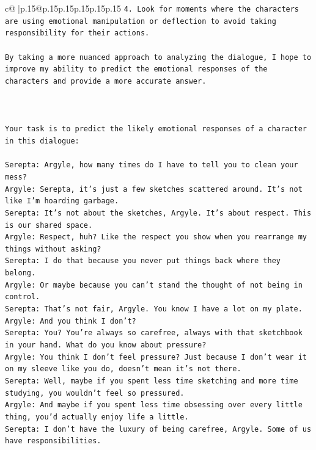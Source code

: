 \documentclass{article}
\begin{document}
{\begin{supertabular}{c@{$\;$}|p{.15\linewidth}@{}p{.15\linewidth}p{.15\linewidth}p{.15\linewidth}p{.15\linewidth}p{.15\linewidth}}
{{{\texttt{4. Look for moments where the characters are using emotional manipulation or deflection to avoid taking responsibility for their actions.} \\
\\ 
\texttt{By taking a more nuanced approach to analyzing the dialogue, I hope to improve my ability to predict the emotional responses of the characters and provide a more accurate answer.} \\
\\ 
\\ 
\\ 
\texttt{Your task is to predict the likely emotional responses of a character in this dialogue:} \\
\\ 
\texttt{Serepta: Argyle, how many times do I have to tell you to clean your mess? } \\
\texttt{Argyle: Serepta, it's just a few sketches scattered around. It's not like I'm hoarding garbage.} \\
\texttt{Serepta: It's not about the sketches, Argyle. It's about respect. This is our shared space.} \\
\texttt{Argyle: Respect, huh? Like the respect you show when you rearrange my things without asking?} \\
\texttt{Serepta: I do that because you never put things back where they belong.} \\
\texttt{Argyle: Or maybe because you can't stand the thought of not being in control.} \\
\texttt{Serepta: That's not fair, Argyle. You know I have a lot on my plate.} \\
\texttt{Argyle: And you think I don't? } \\
\texttt{Serepta: You? You're always so carefree, always with that sketchbook in your hand. What do you know about pressure?} \\
\texttt{Argyle: You think I don't feel pressure? Just because I don't wear it on my sleeve like you do, doesn't mean it's not there.} \\
\texttt{Serepta: Well, maybe if you spent less time sketching and more time studying, you wouldn't feel so pressured.} \\
\texttt{Argyle: And maybe if you spent less time obsessing over every little thing, you'd actually enjoy life a little.} \\
\texttt{Serepta: I don't have the luxury of being carefree, Argyle. Some of us have responsibilities.} \\
}}}
\end{supertabular}}
\end{document}
